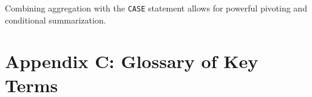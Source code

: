 Combining aggregation with the \texttt{CASE} statement allows for
powerful pivoting and conditional summarization.

\begin{Shaded}
\begin{Highlighting}[]
    \NormalTok{(}\OperatorTok{*}\NormalTok{) }
    \NormalTok{(} \OperatorTok{=}      \NormalTok{) }
    \NormalTok{(} \OperatorTok{=}      \NormalTok{) }
 
\end{Highlighting}
\end{Shaded}

\bigskip

\section{Appendix C: Glossary of Key
Terms}\label{appendix-c-glossary-of-key-terms}

